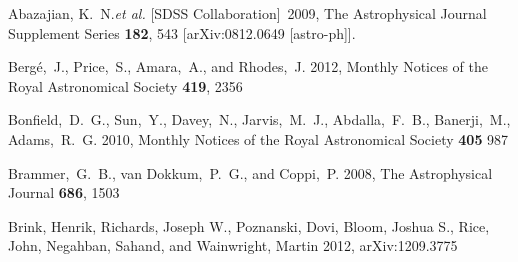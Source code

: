 \documentclass[prd,nofootbib,floatfix,11pt,tightenlines]{revtex4}
\begin{document}
\begin{thebibliography}{99}

  Abazajian, K.~N.{\it et al.}  [SDSS Collaboration]~2009,
  The Astrophysical Journal Supplement Series  {\bf 182}, 543
  [arXiv:0812.0649 [astro-ph]].





Berg\'e,~J., Price,~S., Amara,~A., and Rhodes,~J. 2012,
Monthly Notices of the Royal Astronomical Society {\bf 419}, 2356



Bonfield,~D.~G., Sun,~Y., Davey,~N., Jarvis,~M.~J., Abdalla,~F.~B.,
Banerji,~M., Adams,~R.~G. 2010, Monthly Notices of the Royal Astronomical Society 
{\bf 405} 987

Brammer,~G.~B., van Dokkum,~P.~G., and Coppi,~P. 2008,
The Astrophysical Journal {\bf 686}, 1503

Brink, Henrik, Richards, Joseph W., Poznanski, Dovi, Bloom, Joshua S., Rice,
John, Negahban, Sahand, and Wainwright, Martin 2012, arXiv:1209.3775


\end{thebibliography}
\end{document}
